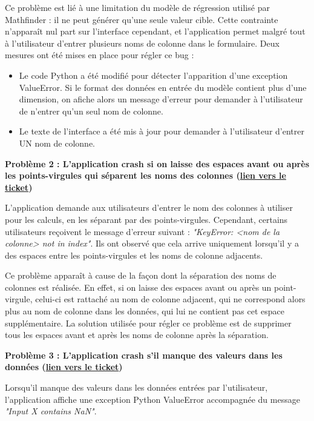 \documentclass[french]{article}
\begin{document}
    Ce problème est lié à une limitation du modèle de régression utilisé par Mathfinder : il ne peut générer qu'une seule valeur cible. Cette contrainte n'apparaît nul part sur l'interface cependant, et l'application permet malgré tout à l'utilisateur d'entrer plusieurs noms de colonne dans le formulaire. Deux mesures ont été mises en place pour régler ce bug :
    \begin{itemize}
        \item Le code Python a été modifié pour détecter l'apparition d'une exception ValueError. Si le format des données en entrée du modèle contient plus d'une dimension, on afiche alors un message d'erreur pour demander à l'utilisateur de n'entrer qu'un seul nom de colonne.
        \item Le texte de l'interface a été mis à jour pour demander à l'utilisateur d'entrer UN nom de colonne.
    \end{itemize}

    \textbf{Problème 2 : L'application crash si on laisse des espaces avant ou après les points-virgules qui séparent les noms des colonnes (\href{https://github.com/vinpap/mathfinder/issues/3}{lien vers le ticket})}

    L'application demande aux utilisateurs d'entrer le nom des colonnes à utiliser pour les calculs, en les séparant par des points-virgules. Cependant, certains utilisateurs reçoivent le message d'erreur suivant : \textit{"KeyError: <nom de la colonne> not in index"}. Ils ont observé que cela arrive uniquement lorsqu'il y a des espaces entre les points-virgules et les noms de colonne adjacents.

    Ce problème apparaît à cause de la façon dont la séparation des noms de colonnes est réalisée. En effet, si on laisse des espaces avant ou après un point-virgule, celui-ci est rattaché au nom de colonne adjacent, qui ne correspond alors plus au nom de colonne dans les données, qui lui ne contient pas cet espace supplémentaire. La solution utilisée pour régler ce problème est de supprimer tous les espaces avant et après les noms de colonne après la séparation. 

    \textbf{Problème 3 : L'application crash s'il manque des valeurs dans les données (\href{https://github.com/vinpap/mathfinder/issues/4}{lien vers le ticket})}

    Lorsqu'il manque des valeurs dans les données entrées par l'utilisateur, l'application affiche une exception Python ValueError accompagnée du message \textit{"Input X contains NaN"}.
\end{document}
